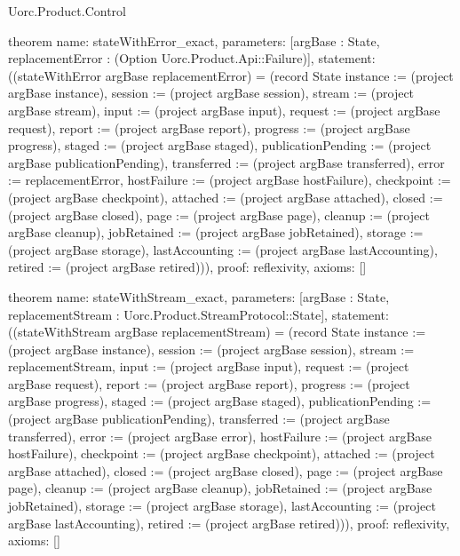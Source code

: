 \begin{lexlean}{Uorc.Product.Control}
\begin{semanticmodule}
theorem{
  name: stateWithError_exact,
  parameters: [argBase : State, replacementError : (Option Uorc.Product.Api::Failure)],
  statement: ((stateWithError argBase replacementError) = (record State {instance := (project argBase instance), session := (project argBase session), stream := (project argBase stream), input := (project argBase input), request := (project argBase request), report := (project argBase report), progress := (project argBase progress), staged := (project argBase staged), publicationPending := (project argBase publicationPending), transferred := (project argBase transferred), error := replacementError, hostFailure := (project argBase hostFailure), checkpoint := (project argBase checkpoint), attached := (project argBase attached), closed := (project argBase closed), page := (project argBase page), cleanup := (project argBase cleanup), jobRetained := (project argBase jobRetained), storage := (project argBase storage), lastAccounting := (project argBase lastAccounting), retired := (project argBase retired)})),
  proof: reflexivity{},
  axioms: []
}

theorem{
  name: stateWithStream_exact,
  parameters: [argBase : State, replacementStream : Uorc.Product.StreamProtocol::State],
  statement: ((stateWithStream argBase replacementStream) = (record State {instance := (project argBase instance), session := (project argBase session), stream := replacementStream, input := (project argBase input), request := (project argBase request), report := (project argBase report), progress := (project argBase progress), staged := (project argBase staged), publicationPending := (project argBase publicationPending), transferred := (project argBase transferred), error := (project argBase error), hostFailure := (project argBase hostFailure), checkpoint := (project argBase checkpoint), attached := (project argBase attached), closed := (project argBase closed), page := (project argBase page), cleanup := (project argBase cleanup), jobRetained := (project argBase jobRetained), storage := (project argBase storage), lastAccounting := (project argBase lastAccounting), retired := (project argBase retired)})),
  proof: reflexivity{},
  axioms: []
}


\end{semanticmodule}
\end{lexlean}
